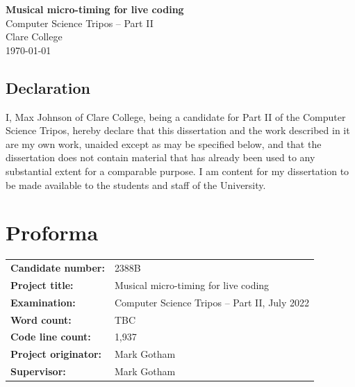 \documentclass[12pt,twoside,openright]{report}
\begin{document}

\begin{titlepage}
    \pagestyle{empty}


    \vspace*{60mm}
    \begin{center}
    \Huge
    \textbf{Musical micro-timing for live coding} \\[5mm]
    Computer Science Tripos -- Part II \\[5mm]
    Clare College \\[5mm]
    \today
    \end{center}
\end{titlepage}


\pagestyle{plain}

\section*{Declaration}

I, Max Johnson of Clare College, being a candidate for Part II of the Computer Science Tripos, hereby declare that this dissertation and the work described in it are my own work, unaided except as may be specified below, and that the dissertation does not contain material that has already been used to any substantial extent for a comparable purpose. I am content for my dissertation to be made available to the students and staff of the University.

\bigskip
{}

\medskip
{}


\newpage
\chapter*{Proforma}

\begin{tabular}{ll}
\bf Candidate number:   & 2388B \\
\bf Project title:      & Musical micro-timing for live coding \\
\bf Examination:        & Computer Science Tripos -- Part II, July 2022  \\
\bf Word count:         & TBC \\
\bf Code line count:    & 1,937 \\
\bf Project originator: & Mark Gotham \\
\bf Supervisor:         & Mark Gotham
\end{tabular}
\end{document}
